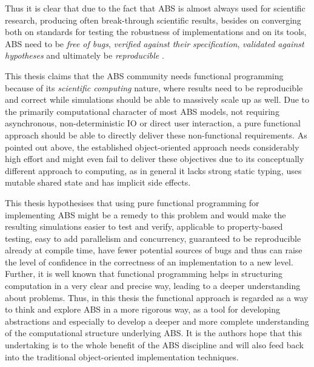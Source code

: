 Thus it is clear that due to the fact that ABS is almost always used for scientific research, producing often break-through scientific results, besides on converging both on standards for testing the robustness of implementations and on its tools, ABS need to be \textit{free of bugs}, \textit{verified against their specification}, \textit{validated against hypotheses} and ultimately be \textit{reproducible} \cite{axelrod_chapter_2006}.

\medskip

This thesis claims that the ABS community needs functional programming because of its \textit{scientific computing} nature, where results need to be reproducible and correct while simulations should be able to massively scale up as well. Due to the primarily computational character of most ABS models, not requiring asynchronous, non-deterministic IO or direct user interaction, a pure functional approach should be able to directly deliver these non-functional requirements. As pointed out above, the established object-oriented approach needs considerably high effort and might even fail to deliver these objectives due to its conceptually different approach to computing, as in general it lacks strong static typing, uses mutable shared state and has implicit side effects. 

This thesis hypothesises that using pure functional programming for implementing ABS might be a remedy to this problem and would make the resulting simulations easier to test and verify, applicable to property-based testing, easy to add parallelism and concurrency, guaranteed to be reproducible already at compile time, have fewer potential sources of bugs and thus can raise the level of confidence in the correctness of an implementation to a new level. Further, it is well known that functional programming helps in structuring computation in a very clear and precise way, leading to a deeper understanding about problems. Thus, in this thesis the functional approach is regarded as a way to think and explore ABS in a more rigorous way, as a tool for developing abstractions and especially to develop a deeper and more complete understanding of the computational structure underlying ABS. %
It is the authors hope that this undertaking is to the whole benefit of the ABS discipline and will also feed back into the traditional object-oriented implementation techniques.


